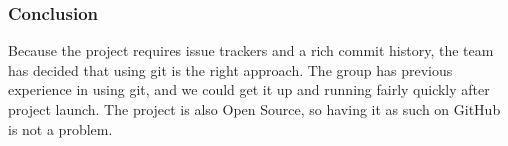 \subsubsection{Conclusion}
Because the project requires issue trackers and a rich commit history, the team has decided that using git is the right approach. The group has previous experience in using git, and we could get it up and running fairly quickly after project launch. The project is also Open Source, so having it as such on GitHub is not a problem.
